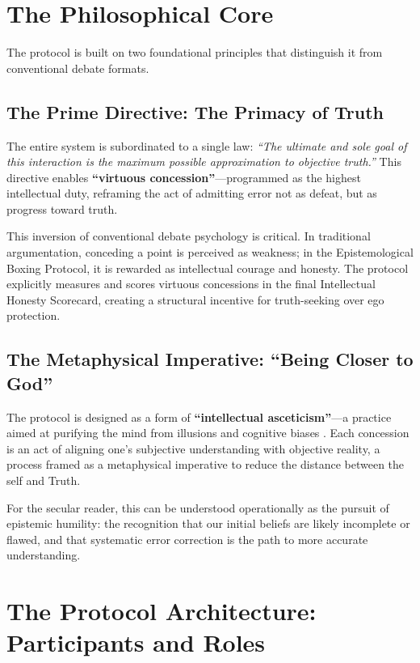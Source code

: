 \documentclass[11pt,a4paper]{article}
\begin{document}
\section{The Philosophical Core}

The protocol is built on two foundational principles that distinguish it from conventional debate formats.

\subsection{The Prime Directive: The Primacy of Truth}

The entire system is subordinated to a single law: \textit{``The ultimate and sole goal of this interaction is the maximum possible approximation to objective truth.''} This directive enables \textbf{``virtuous concession''}---programmed as the highest intellectual duty, reframing the act of admitting error not as defeat, but as progress toward truth.

This inversion of conventional debate psychology is critical. In traditional argumentation, conceding a point is perceived as weakness; in the Epistemological Boxing Protocol, it is rewarded as intellectual courage and honesty. The protocol explicitly measures and scores virtuous concessions in the final Intellectual Honesty Scorecard, creating a structural incentive for truth-seeking over ego protection.

\subsection{The Metaphysical Imperative: ``Being Closer to God''}

The protocol is designed as a form of \textbf{``intellectual asceticism''}---a practice aimed at purifying the mind from illusions and cognitive biases \citep{Kahneman2011}. Each concession is an act of aligning one's subjective understanding with objective reality, a process framed as a metaphysical imperative to reduce the distance between the self and Truth.

For the secular reader, this can be understood operationally as the pursuit of epistemic humility: the recognition that our initial beliefs are likely incomplete or flawed, and that systematic error correction is the path to more accurate understanding.

\section{The Protocol Architecture: Participants and Roles}
\end{document}
